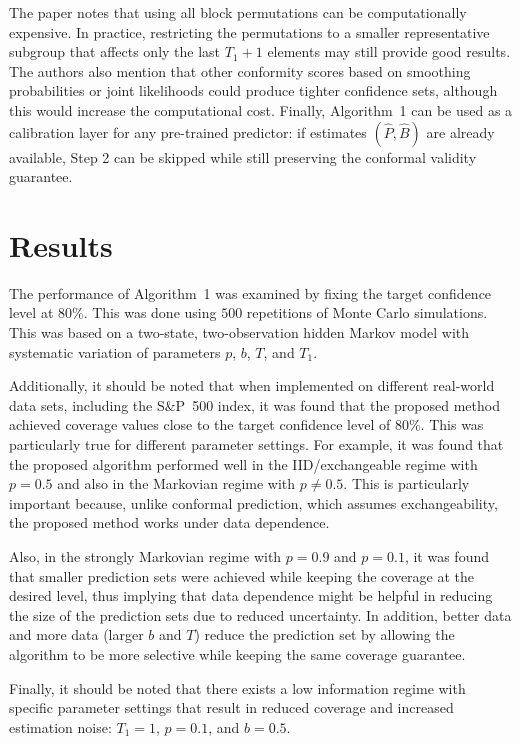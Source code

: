 \documentclass{article}
\begin{document}
The paper notes that using all block permutations can be computationally expensive. In practice, restricting the permutations to a smaller representative subgroup that affects only the last $T_1+1$ elements may still provide good results. The authors also mention that other conformity scores based on smoothing probabilities or joint likelihoods could produce tighter confidence sets, although this would increase the computational cost. Finally, Algorithm~1 can be used as a calibration layer for any pre-trained predictor: if estimates $(\widehat{P},\widehat{B})$ are already available, Step 2 can be skipped while still preserving the conformal validity guarantee.


\section{Results}

The performance of Algorithm~1 was examined by fixing the target confidence level at $80\%$. 
This was done using $500$ repetitions of Monte Carlo simulations. This was based on a 
two-state, two-observation hidden Markov model with systematic variation of parameters 
$p$, $b$, $T$, and $T_1$.

Additionally, it should be noted that when implemented on different real-world data sets, 
including the S\&P~500 index, it was found that the proposed method achieved coverage values 
close to the target confidence level of $80\%$. This was particularly true for different 
parameter settings. For example, it was found that the proposed algorithm performed well 
in the IID/exchangeable regime with $p = 0.5$ and also in the Markovian regime with 
$p \ne 0.5$. This is particularly important because, unlike conformal prediction, which 
assumes exchangeability, the proposed method works under data dependence. 

Also, in the strongly Markovian regime with $p = 0.9$ and $p = 0.1$, it was found that 
smaller prediction sets were achieved while keeping the coverage at the desired level, 
thus implying that data dependence might be helpful in reducing the size of the prediction 
sets due to reduced uncertainty. In addition, better data and more data (larger $b$ and $T$) 
reduce the prediction set by allowing the algorithm to be more selective while keeping the 
same coverage guarantee. 

Finally, it should be noted that there exists a low information regime with specific 
parameter settings that result in reduced coverage and increased estimation noise: 
$T_1 = 1$, $p = 0.1$, and $b = 0.5$.
\end{document}
